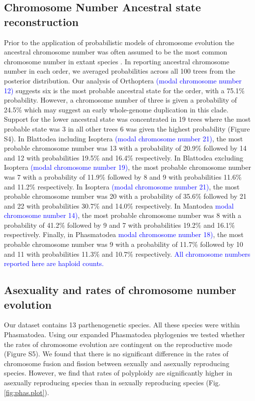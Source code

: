 \documentclass[]{rsos}%
\begin{document}
\subsection{Chromosome Number Ancestral state reconstruction}
Prior to the application of probabilistic models of chromosome evolution the ancestral chromosome number was often assumed to be the most common chromosome number in extant species \cite{white1973}.
In reporting ancestral chromosome number in each order, we averaged probabilities across all 100 trees from the posterior distribution. 
Our analysis of Orthoptera \textcolor{blue}{(modal chromosome number 12)} suggests six is the most probable ancestral state for the order, with a 75.1\% probability.
However, a chromosome number of three is given a probability of 24.5\% which may suggest an early whole-genome duplication in this clade.
Support for the lower ancestral state was concentrated in 19 trees where the most probable state was 3 in all other trees 6 was given the highest probability (Figure S4).
In Blattodea including Isoptera \textcolor{blue}{(modal  chromosome number 21)}, the most probable chromosome number was 13 with a probability of 20.9\% followed by 14 and 12 with probabilities 19.5\% and 16.4\% respectively. 
In Blattodea excluding Isoptera \textcolor{blue}{(modal chromosome number 19)}, the most probable chromosome number was 7 with a probability of 11.9\% followed by 8 and 9 with probabilities 11.6\% and 11.2\% respectively.
In Isoptera \textcolor{blue}{(modal chromosome number 21)}, the most probable chromosome number was 20 with a probability of 35.6\% followed by 21 and 22 with probabilities 30.7\% and 14.0\% respectively.
In Mantodea \textcolor{blue}{modal chromosome number 14)}, the most probable chromosome number was 8 with a probability of 41.2\% followed by 9 and 7 with probabilities 19.2\% and 16.1\% respectively.
Finally, in Phasmatodea \textcolor{blue}{modal chromosome number 18)}, the most probable chromosome number was 9 with a probability of 11.7\% followed by 10 and 11 with probabilities 11.3\% and 10.7\% respectively.
\textcolor{blue}{All chromosome numbers reported here are haploid counts.}

\subsection{Asexuality and rates of chromosome number evolution}
Our dataset contains 13 parthenogenetic species.
All these species were within Phasmatodea.
Using our expanded Phasmatodea phylogenies we tested whether the rates of chromosome evolution are contingent on the reproductive mode (Figure S5).
We found that there is no significant difference in the rates of chromosome fusion and fission between sexually and asexually reproducing species.
However, we find that rates of polyploidy are significantly higher in asexually reproducing species than in sexually reproducing species (Fig. \ref{fig:phas.plot}).
\end{document}
